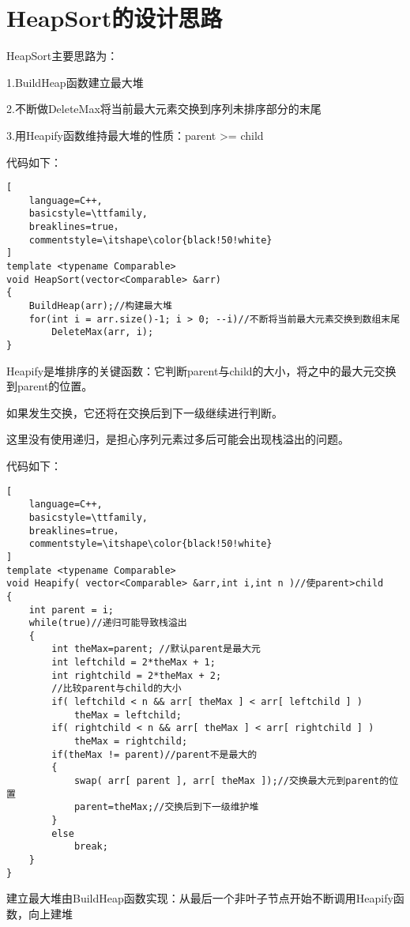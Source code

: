 \documentclass[UTF8]{ctexart}
\begin{document}
\pagestyle{fancy}
\fancyhead{}

\section{HeapSort的设计思路}
HeapSort主要思路为：

1.BuildHeap函数建立最大堆

2.不断做DeleteMax将当前最大元素交换到序列未排序部分的末尾

3.用Heapify函数维持最大堆的性质：parent >= child

代码如下：

\begin{lstlisting}[
    language=C++,
    basicstyle=\ttfamily,
    breaklines=true，
    commentstyle=\itshape\color{black!50!white}
]
template <typename Comparable>
void HeapSort(vector<Comparable> &arr)
{
    BuildHeap(arr);//构建最大堆
    for(int i = arr.size()-1; i > 0; --i)//不断将当前最大元素交换到数组末尾
        DeleteMax(arr, i);
}
\end{lstlisting}
Heapify是堆排序的关键函数：它判断parent与child的大小，将之中的最大元交换到parent的位置。

如果发生交换，它还将在交换后到下一级继续进行判断。

这里没有使用递归，是担心序列元素过多后可能会出现栈溢出的问题。

代码如下：

\begin{lstlisting}[
    language=C++,
    basicstyle=\ttfamily,
    breaklines=true，
    commentstyle=\itshape\color{black!50!white}
]
template <typename Comparable>
void Heapify( vector<Comparable> &arr,int i,int n )//使parent>child
{
    int parent = i;
    while(true)//递归可能导致栈溢出
    {   
        int theMax=parent; //默认parent是最大元
        int leftchild = 2*theMax + 1;
        int rightchild = 2*theMax + 2;
        //比较parent与child的大小
        if( leftchild < n && arr[ theMax ] < arr[ leftchild ] )
            theMax = leftchild;
        if( rightchild < n && arr[ theMax ] < arr[ rightchild ] )
            theMax = rightchild;
        if(theMax != parent)//parent不是最大的
        {
            swap( arr[ parent ], arr[ theMax ]);//交换最大元到parent的位置
            parent=theMax;//交换后到下一级维护堆
        }
        else
            break;
    }
}
\end{lstlisting}
建立最大堆由BuildHeap函数实现：从最后一个非叶子节点开始不断调用Heapify函数，向上建堆
\end{document}
